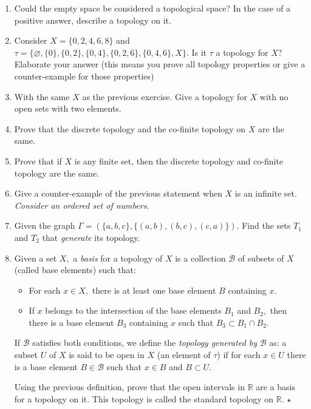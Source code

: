 \documentclass[
	fontsize=10pt, %
	twoside=false, %
	secnumdepth=1, %
]{kaobook}
\begin{document}
\begin{enumerate}

\item Could the empty space be considered a topological space? In the case of a positive answer, describe a topology on it. 

\item Consider $X=\{0,2,4,6,8\}$ and $\tau=\{\varnothing, \{0\},\{0,2\},\{0,4\},\{0,2,6\},\{0,4,6\},X\}.$ Is it $\tau$ a topology for $X$? Elaborate your answer (this means you prove all topology properties or give a counter-example for those properties)

\item With the same $X$ as the previous exercise. Give a topology for $X$ with no open sets with two elements.

\item Prove that the discrete topology and the co-finite topology on $X$ are the same. 

\item Prove that if $X$ is any finite set, then the discrete topology and co-finite topology are the same. 

\item Give a counter-example of the previous statement when $X$ is an infinite set. \emph{Consider an ordered set of numbers.}

\item Given the graph $\Gamma=\left(\{a,b,c\},\{(a,b),(b,c),(c,a)\}\right).$ Find the sets $T_1$ and $T_2$ that \emph{generate} its topology.

\item Given a set $X,$ a \emph{basis} for a topology of $X$ is a collection $\mathcal{B}$ of subsets of $X$ (called base elements) such that:
\begin{itemize}
\item For each $x\in X,$ there is at least one base element $B$ containing $x.$
\item If $x$ belongs to the intersection of the base elements $B_1$ and $B_2,$ then there is a base element $B_3$ containing $x$ such that $B_3\subset B_1\cap B_2.$ 
\end{itemize}
If $\mathcal{B}$ satisfies both conditions, we define the \emph{topology generated by} $\mathcal{B}$ as: a subset $U$ of $X$ is said to be open in $X$ (an element of $\tau$) if for each $x\in U$ there is a base element $B\in\mathcal{B}$ such that $x\in B$ and $B\subset U.$

Using the previous definition, prove that the open intervals in $\mathbb{R}$ are a basis for a topology on it. This topology is called the standard topology on $\mathbb{R}.$ $\star$
\end{enumerate}
\end{document}

